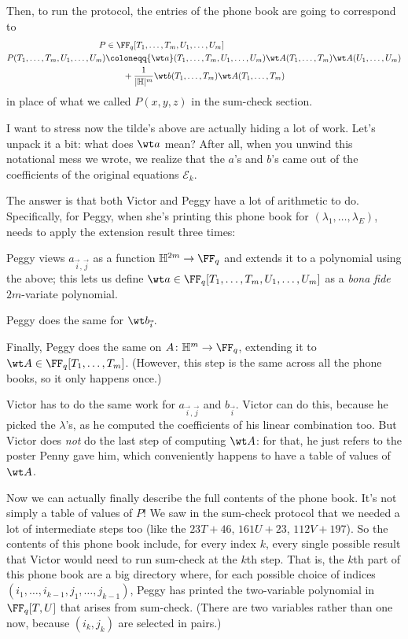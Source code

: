 \documentclass[11pt]{scrreprt}
\newcommand{\HH}{\mathbb H}
\begin{document}
Then, to run the protocol, the entries of the phone book are going to correspond to
\begin{align*}
  P &\in \FF_q[T_1, \dots, T_m, U_1, \dots, U_m] \\
  P(T_1, \dots, T_m, U_1, \dots, U_m) &\coloneqq
    {\wt a}(T_1, \dots, T_m, U_1, \dots, U_m) \wt A(T_1, \dots, T_m) \wt A(U_1, \dots,
    U_m) \\
    &\qquad + \frac{1}{|\HH|^m} {\wt b}(T_1, \dots, T_m) \wt A(T_1, \dots, T_m)
\end{align*}
in place of what we called $P(x,y,z)$ in the sum-check section.

I want to stress now the tilde's above are actually hiding a lot of work.
Let's unpack it a bit: what does $\wt a$ mean?
After all, when you unwind this notational mess we wrote,
we realize that the $a$'s and $b$'s came out of the coefficients of the original
equations $\mathcal E_k$.

The answer is that both Victor and Peggy have a lot of arithmetic to do.
Specifically, for Peggy,
when she's printing this phone book for $(\lambda_1, \dots, \lambda_E)$,
needs to apply the extension result three times:
\begin{itemize}
  \ii Peggy views $a_{\vec i, \vec j}$ as a function $\HH^{2m} \to \FF_q$
  and extends it to a polynomial using the above;
  this lets us define
  $\wt a \in \FF_q[T_1, \dots, T_m, U_1, \dots, U_m]$
  as a \emph{bona fide} $2m$-variate polynomial.

  \ii Peggy does the same for $\wt b_{\vec i}$.

  \ii Finally, Peggy does the same on $A \colon \HH^m \to \FF_q$,
  extending it to $\wt A \in \FF_q[T_1, \dots, T_m]$.
  (However, this step is the same across all the phone books, so it only happens once.)
\end{itemize}
Victor has to do the same work for $a_{\vec i, \vec j}$ and $b_{\vec i}$.
Victor can do this, because he picked the $\lambda$'s,
as he computed the coefficients of his linear combination too.
But Victor does \emph{not} do the last step of computing $\wt A$:
for that, he just refers to the poster Penny gave him,
which conveniently happens to have a table of values of $\wt A$.

Now we can actually finally describe the full contents of the phone book.
It's not simply a table of values of $P$!
We saw in the sum-check protocol that we needed a lot of intermediate steps too
(like the $23T+46$, $161U+23$, $112V+197$).
So the contents of this phone book include, for every index $k$,
every single possible result that Victor would need to run sum-check at the $k$th step.
That is, the $k$th part of this phone book are a big directory where,
for each possible choice of indices $(i_1, \dots, i_{k-1}, j_1, \dots, j_{k-1})$,
Peggy has printed the two-variable polynomial in $\FF_q[T,U]$ that arises from sum-check.
(There are two variables rather than one now,
because $(i_k, j_k)$ are selected in pairs.)
\end{document}
